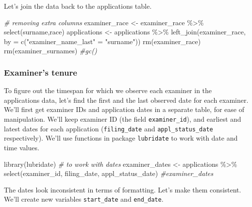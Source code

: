 \documentclass[
]{article}
\newenvironment{Shaded}{\begin{snugshade}}{\end{snugshade}}
\newcommand{\AttributeTok}[1]{\textcolor[rgb]{0.77,0.63,0.00}{#1}}
\newcommand{\CommentTok}[1]{\textcolor[rgb]{0.56,0.35,0.01}{\textit{#1}}}
\newcommand{\FunctionTok}[1]{\textcolor[rgb]{0.00,0.00,0.00}{#1}}
\newcommand{\NormalTok}[1]{#1}
\newcommand{\OtherTok}[1]{\textcolor[rgb]{0.56,0.35,0.01}{#1}}
\newcommand{\SpecialCharTok}[1]{\textcolor[rgb]{0.00,0.00,0.00}{#1}}
\newcommand{\StringTok}[1]{\textcolor[rgb]{0.31,0.60,0.02}{#1}}
\begin{document}
Let's join the data back to the applications table.

\begin{Shaded}
\begin{Highlighting}[]
\CommentTok{\# removing extra columns}
\NormalTok{examiner\_race }\OtherTok{\textless{}{-}}\NormalTok{ examiner\_race }\SpecialCharTok{\%\textgreater{}\%} 
  \FunctionTok{select}\NormalTok{(surname,race)}
\NormalTok{applications }\OtherTok{\textless{}{-}}\NormalTok{ applications }\SpecialCharTok{\%\textgreater{}\%} 
  \FunctionTok{left\_join}\NormalTok{(examiner\_race, }\AttributeTok{by =} \FunctionTok{c}\NormalTok{(}\StringTok{"examiner\_name\_last"} \OtherTok{=} \StringTok{"surname"}\NormalTok{))}
\FunctionTok{rm}\NormalTok{(examiner\_race)}
\FunctionTok{rm}\NormalTok{(examiner\_surnames)}
\CommentTok{\#gc()}
\end{Highlighting}
\end{Shaded}

\hypertarget{examiners-tenure}{%
\subsubsection{Examiner's tenure}\label{examiners-tenure}}

To figure out the timespan for which we observe each examiner in the
applications data, let's find the first and the last observed date for
each examiner. We'll first get examiner IDs and application dates in a
separate table, for ease of manipulation. We'll keep examiner ID (the
field \texttt{examiner\_id}), and earliest and latest dates for each
application (\texttt{filing\_date} and \texttt{appl\_status\_date}
respectively). We'll use functions in package \texttt{lubridate} to work
with date and time values.

\begin{Shaded}
\begin{Highlighting}[]
\FunctionTok{library}\NormalTok{(lubridate) }\CommentTok{\# to work with dates}
\NormalTok{examiner\_dates }\OtherTok{\textless{}{-}}\NormalTok{ applications }\SpecialCharTok{\%\textgreater{}\%} 
  \FunctionTok{select}\NormalTok{(examiner\_id, filing\_date, appl\_status\_date) }
\CommentTok{\#examiner\_dates}
\end{Highlighting}
\end{Shaded}

The dates look inconsistent in terms of formatting. Let's make them
consistent. We'll create new variables \texttt{start\_date} and
\texttt{end\_date}.
\end{document}

